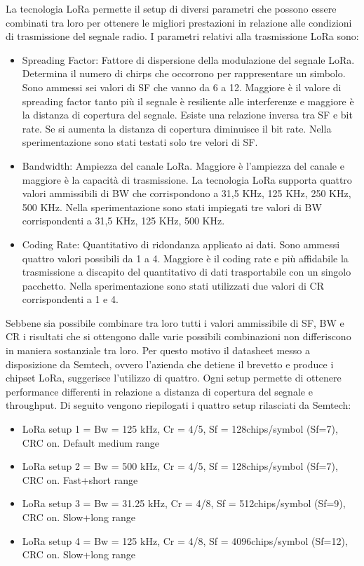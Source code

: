 \documentclass[12pt,a4paper,openright,twoside]{report}
\begin{document}
La tecnologia LoRa permette il setup di diversi parametri che possono essere combinati tra loro per ottenere le migliori prestazioni in relazione alle condizioni di trasmissione del segnale radio. I parametri relativi alla trasmissione LoRa sono:
\begin{itemize}                       
\item Spreading Factor: Fattore di dispersione della modulazione del segnale LoRa. Determina il numero di chirps che occorrono per rappresentare un simbolo. Sono ammessi sei valori di SF che vanno da 6 a 12. Maggiore \`e il valore di spreading factor tanto pi\`u il segnale \`e resiliente alle interferenze e maggiore \`e la distanza di copertura del segnale. Esiste una relazione inversa tra SF e bit rate. Se si aumenta la distanza di copertura diminuisce il bit rate. Nella sperimentazione sono stati testati solo tre velori di SF.
\item Bandwidth: Ampiezza del canale LoRa. Maggiore \`e l'ampiezza del canale e maggiore \`e la capacit\`a di trasmissione. La tecnologia LoRa supporta quattro valori ammissibili di BW che corrispondono a 31,5 KHz, 125 KHz, 250 KHz, 500 KHz. Nella sperimentazione sono stati impiegati tre valori di BW corrispondenti a 31,5 KHz, 125 KHz, 500 KHz.
\item Coding Rate: Quantitativo di ridondanza applicato ai dati. Sono ammessi quattro valori possibili da 1 a 4. Maggiore \`e il coding rate e pi\`u affidabile la trasmissione a discapito del quantitativo di dati trasportabile con un singolo pacchetto. Nella sperimentazione sono stati utilizzati due valori di CR corrispondenti a 1 e 4. 
\end{itemize}
Sebbene sia possibile combinare tra loro tutti i valori ammissibile di SF, BW e CR i risultati che si ottengono dalle varie possibili combinazioni non differiscono in maniera sostanziale tra loro.
Per questo motivo il datasheet messo a disposizione da Semtech, ovvero l'azienda che detiene il brevetto e produce i chipset LoRa, suggerisce l'utilizzo di quattro. Ogni setup permette di ottenere performance differenti in relazione a distanza di copertura del segnale e throughput.
Di seguito vengono riepilogati i quattro setup rilasciati da Semtech:
\begin{itemize}                       
\item LoRa setup 1 =  Bw = 125 kHz, Cr = 4/5, Sf = 128chips/symbol (Sf=7), CRC on. Default medium range
\item LoRa setup 2 =  Bw = 500 kHz, Cr = 4/5, Sf = 128chips/symbol (Sf=7), CRC on. Fast+short range
\item LoRa setup 3 =  Bw = 31.25 kHz, Cr = 4/8, Sf = 512chips/symbol (Sf=9), CRC on. Slow+long range
\item LoRa setup 4 = Bw = 125 kHz, Cr = 4/8, Sf = 4096chips/symbol (Sf=12), CRC on. Slow+long range
\end{itemize}
\end{document}

